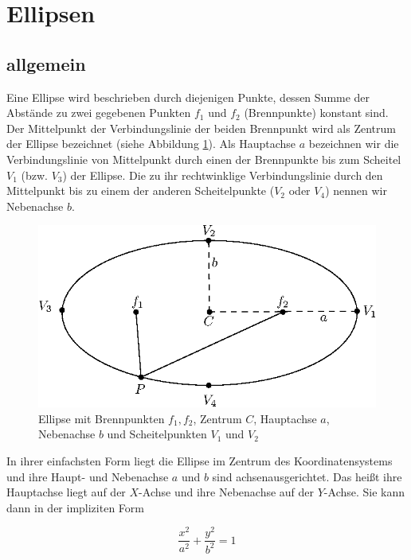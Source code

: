\section{Ellipsen}
\label{s:ellipse}
\subsection{allgemein}
\label{s:ellipseGeneral}

\begin{definition}[Ellipse]
	Eine Ellipse wird beschrieben durch diejenigen Punkte, dessen Summe der Abstände zu zwei gegebenen Punkten $f_1$ und $f_2$ (Brennpunkte) konstant sind. Der Mittelpunkt der Verbindungslinie der beiden Brennpunkt wird als Zentrum der Ellipse bezeichnet (siehe Abbildung \ref{fig:ellipseDef}). 
	Als Hauptachse $a$ bezeichnen wir die Verbindungslinie von Mittelpunkt durch einen der Brennpunkte bis zum Scheitel $V_1$ (bzw. $V_3$) der Ellipse. Die zu ihr rechtwinklige Verbindungslinie durch den Mittelpunkt bis zu einem der anderen Scheitelpunkte ($V_2$ oder $V_4$) nennen wir Nebenachse $b$.
\end{definition}

\begin{figure}[!htb]
	\centering
	\includegraphics[scale=.9]{images/ellipse_focalDef.eps}
	\caption{Ellipse mit Brennpunkten $f_1, f_2$, Zentrum $C$, Hauptachse $a$, Nebenachse $b$ und Scheitelpunkten $V_1$ und $V_2$}
	\label{fig:ellipseDef}
\end{figure}

In ihrer einfachsten Form liegt die Ellipse im Zentrum des Koordinatensystems und ihre Haupt- und Nebenachse $a$ und $b$ sind achsenausgerichtet. Das heißt ihre Hauptachse liegt auf der $X$-Achse und ihre Nebenachse auf der $Y$-Achse. Sie kann dann in der impliziten Form

\begin{equation} \label{eq:ellipseNoRotNoTrans}
\frac{x^2}{a^2} + \frac{y^2}{b^2} = 1
\end{equation} 

